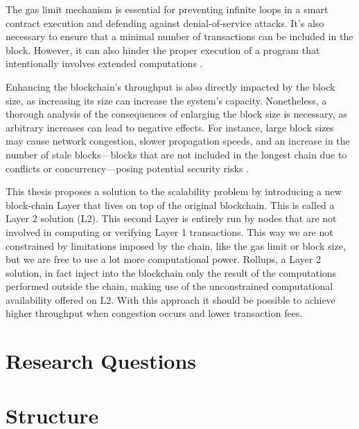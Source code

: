 The gas limit mechanism is essential for preventing infinite loops in a smart contract execution and defending against denial-of-service attacks. It's also necessary to ensure that a minimal number of transactions can be included in the block. However, it can also hinder the proper execution of a program that intentionally involves extended computations \cite{wood_ethereum_nodate}.

Enhancing the blockchain's throughput is also directly impacted by the block size, as increasing its size can increase the system's capacity. Nonetheless, a thorough analysis of the consequences of enlarging the block size is necessary, as arbitrary increases can lead to negative effects. For instance, large block sizes may cause network congestion, slower propagation speeds, and an increase in the number of stale blocks—blocks that are not included in the longest chain due to conflicts or concurrency—posing potential security risks \cite{gervais_security_2016}.

This thesis proposes a solution to the scalability problem by introducing a new block-chain Layer that lives on top of the original blockchain. This is called a Layer 2 solution (L2). This second Layer is entirely run by nodes that are not involved in computing or verifying Layer 1 transactions. This way we are not constrained by limitations imposed by the chain, like the gas limit or block size, but we are free to use a lot more computational power. Rollups, a Layer 2 solution, in fact inject into the blockchain only the result of the computations performed outside the chain, making use of the unconstrained computational availability offered on L2. With this approach it should be possible to achieve higher throughput when congestion occurs and lower transaction fees. 

\section{Research Questions}

\section{Structure\label{sec:structure}}


